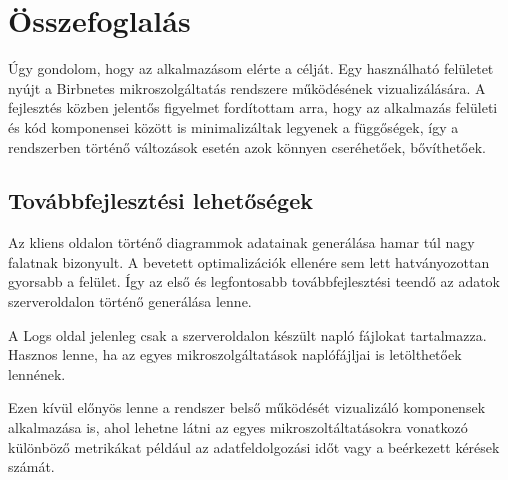 \chapter{Összefoglalás}
\label{chapt:summary}
Úgy gondolom, hogy az alkalmazásom elérte a célját.
Egy használható felületet nyújt a Birbnetes mikroszolgáltatás rendszere működésének vizualizálására.
A fejlesztés közben jelentős figyelmet fordítottam arra, hogy az alkalmazás felületi és kód komponensei között is
minimalizáltak legyenek a függőségek, így a rendszerben történő változások esetén azok könnyen cseréhetőek, bővíthetőek.
\section{Továbbfejlesztési lehetőségek}
Az kliens oldalon történő diagrammok adatainak generálása hamar túl nagy falatnak bizonyult.
A bevetett optimalizációk ellenére sem lett hatványozottan gyorsabb a felület.
Így az első és legfontosabb továbbfejlesztési teendő az adatok szerveroldalon történő generálása lenne.

A Logs oldal jelenleg csak a szerveroldalon készült napló fájlokat tartalmazza.
Hasznos lenne, ha az egyes mikroszolgáltatások naplófájljai is letölthetőek lennének.

Ezen kívül előnyös lenne a rendszer belső működését vizualizáló komponensek alkalmazása is, 
ahol lehetne látni az egyes mikroszoltáltatásokra vonatkozó különböző metrikákat például az adatfeldolgozási időt vagy a beérkezett kérések számát. 